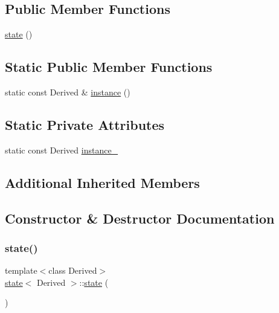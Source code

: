 \subsection*{Public Member Functions}
\begin{DoxyCompactItemize}
\item 
\mbox{\hyperlink{classstate_a21bad8ea1b385d33a7db0836303a6f05}{state}} ()
\end{DoxyCompactItemize}
\subsection*{Static Public Member Functions}
\begin{DoxyCompactItemize}
\item 
static const Derived \& \mbox{\hyperlink{classstate_a7b37e640afb7489d85967b298968e1c0}{instance}} ()
\end{DoxyCompactItemize}
\subsection*{Static Private Attributes}
\begin{DoxyCompactItemize}
\item 
static const Derived \mbox{\hyperlink{classstate_adb98499390fbf548da556d9eaa7272fd}{instance\+\_\+}}
\end{DoxyCompactItemize}
\subsection*{Additional Inherited Members}


\subsection{Constructor \& Destructor Documentation}
\mbox{\label{classstate_a21bad8ea1b385d33a7db0836303a6f05}} 
\subsubsection{\texorpdfstring{state()}{state()}}
{\footnotesize\ttfamily template$<$class Derived$>$ \\
\mbox{\hyperlink{classstate}{state}}$<$ Derived $>$\+::\mbox{\hyperlink{classstate}{state}} (\begin{DoxyParamCaption}{ }\end{DoxyParamCaption})\hspace{0.3cm}{\ttfamily [inline]}}



